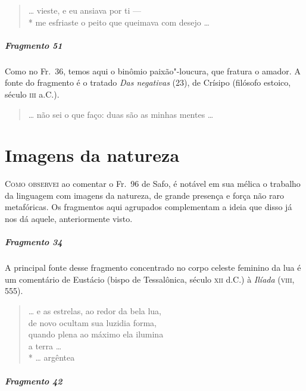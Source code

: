 \begin{verse}
\ldots{} vieste, e eu ansiava por ti --- \\*
me esfriaste o peito que queimava com \qb{}desejo \ldots{}
\end{verse}

\paragraph{Fragmento 51}

{\small Como no Fr.~36, temos aqui o binômio paixão"-loucura, que fratura o amador. A
fonte do fragmento é o tratado \textit{Das negativas} (23), de Crísipo (filósofo
estoico, século \textsc{iii} a.C.).}   \EP[]

\begin{verse}
\ldots{} não sei o que faço: duas são as minhas \qb{}mentes \ldots{}
\end{verse}

\chapter{Imagens da natureza}

\textsc{Como observei} ao comentar o Fr.~96 de Safo, é notável em sua mélica o trabalho
da linguagem com imagens da natureza, de grande presença e força não raro
metafóricas. Os fragmentos aqui agrupados complementam a ideia que disso já nos
dá aquele, anteriormente visto.

\paragraph{Fragmento 34}

{\small A principal fonte desse fragmento concentrado no corpo celeste feminino da lua é
um comentário de Eustácio (bispo de Tessalônica, século \textsc{xii} d.C.) à
\textit{Ilíada }(\textsc{viii}, 555).}

\begin{verse}
\ldots{} e as estrelas, ao redor da bela lua,\\
de novo ocultam sua luzidia forma,\\
quando plena ao máximo ela ilumina\\
a terra \ldots{} \\*
\ldots{} argêntea
\end{verse}

\paragraph{Fragmento 42}


